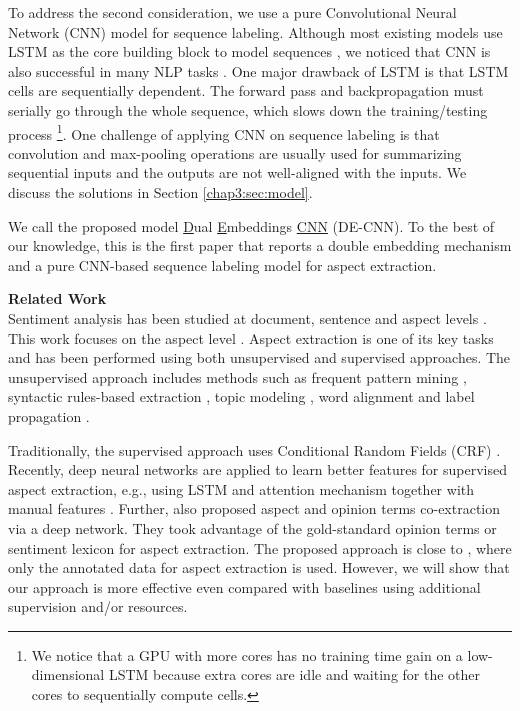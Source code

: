 To address the second consideration, we use a pure Convolutional Neural Network (CNN) \cite{lecun1995convolutional} model for sequence labeling.
Although most existing models use LSTM \cite{hochreiter1997long} as the core building block to model sequences \cite{liu2015fine,li2017deep}, we noticed that CNN is also successful in many NLP tasks \cite{kim2014convolutional,zhang2015character,gehring2017convolutional}.
One major drawback of LSTM is that LSTM cells are sequentially dependent.
The forward pass and backpropagation must serially go through the whole sequence, which slows down the training/testing process
\footnote{We notice that a GPU with more cores has no training time gain on a low-dimensional LSTM because extra cores are idle and waiting for the other cores to sequentially compute cells.}.
One challenge of applying CNN on sequence labeling is that convolution and max-pooling operations are usually used for summarizing sequential inputs and the outputs are not well-aligned with the inputs. We discuss the solutions in Section \ref{chap3:sec:model}.

We call the proposed model \underline{D}ual \underline{E}mbeddings \underline{CNN} (DE-CNN).
To the best of our knowledge, this is the first paper that reports a double embedding mechanism and a pure CNN-based sequence labeling model for aspect extraction.

\textbf{Related Work}\\
Sentiment analysis has been studied at document, sentence and aspect levels \cite{Liu2012,Pang2008OMS,Cambria2012}. This work focuses on the aspect level \cite{HuL2004}. Aspect extraction is one of its key tasks and has been performed using both unsupervised and supervised approaches. 
The unsupervised approach includes methods such as frequent pattern mining \cite{HuL2004,PopescuNE2005}, syntactic rules-based extraction \cite{ZhuangJZ2006,WangBo2008,QiuLBC2011}, topic modeling \cite{MeiLWSZ2007,TitovM2008,Lin2009,Moghaddam2011}, word alignment \cite{KangLiu2013IJCAI} and label propagation \cite{Zhou-wan-xiao:2013:EMNLP,shu2016lifelong}.

Traditionally, the supervised approach \cite{Jakob2010,Mitchell-EtAl:2013:EMNLP,shu2017lifelong} uses Conditional Random Fields (CRF) \cite{Lafferty2001conditional}.
Recently, deep neural networks are applied to learn better features for supervised aspect extraction, e.g., using
LSTM \cite{williams1989learning,hochreiter1997long,liu2015fine} and
attention mechanism \cite{wang2017coupled,he2017unsupervised} together with manual features \cite{poria2016aspect,wang2016recursive}.
Further, \cite{wang2016recursive,wang2017coupled,li2017deep} also proposed aspect and opinion terms co-extraction via a deep network.
They took advantage of the gold-standard opinion terms or sentiment lexicon for aspect extraction.
The proposed approach is close to \cite{liu2015fine}, where only the annotated data for aspect extraction is used. 
However, we will show that our approach is more effective even compared with baselines using additional supervision and/or resources.

